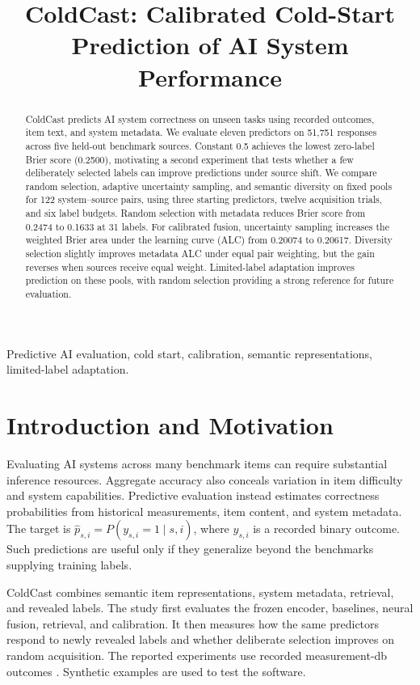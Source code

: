 \documentclass[conference]{IEEEtran}
\title{ColdCast: Calibrated Cold-Start Prediction of AI System Performance}
\author{
\IEEEauthorblockN{Yi Chen Kuo, Sudip Manchare, Jaideep Manupati, Akshada Shailesh Rane}
\IEEEauthorblockA{Department of Computer Science, Virginia Tech, Alexandria, Virginia, USA\\
\{alvin9840, akshada, jaideepm21, msudip\}@vt.edu}
}
\begin{document}
\maketitle

\begin{abstract}
ColdCast predicts AI system correctness on unseen tasks using recorded outcomes, item text, and system metadata. We evaluate eleven predictors on 51,751 responses across five held-out benchmark sources. Constant 0.5 achieves the lowest zero-label Brier score (0.2500), motivating a second experiment that tests whether a few deliberately selected labels can improve predictions under source shift. We compare random selection, adaptive uncertainty sampling, and semantic diversity on fixed pools for 122 system--source pairs, using three starting predictors, twelve acquisition trials, and six label budgets. Random selection with metadata reduces Brier score from 0.2474 to 0.1633 at 31 labels. For calibrated fusion, uncertainty sampling increases the weighted Brier area under the learning curve (ALC) from 0.20074 to 0.20617. Diversity selection slightly improves metadata ALC under equal pair weighting, but the gain reverses when sources receive equal weight. Limited-label adaptation improves prediction on these pools, with random selection providing a strong reference for future evaluation.
\end{abstract}
\begin{IEEEkeywords}
Predictive AI evaluation, cold start, calibration, semantic representations, limited-label adaptation.
\end{IEEEkeywords}

\section{Introduction and Motivation}
Evaluating AI systems across many benchmark items can require substantial inference resources. Aggregate accuracy also conceals variation in item difficulty and system capabilities. Predictive evaluation instead estimates correctness probabilities from historical measurements, item content, and system metadata. The target is $\hat p_{s,i}=P(y_{s,i}=1\mid s,i)$, where $y_{s,i}$ is a recorded binary outcome. Such predictions are useful only if they generalize beyond the benchmarks supplying training labels.

ColdCast combines semantic item representations, system metadata, retrieval, and revealed labels. The study first evaluates the frozen encoder, baselines, neural fusion, retrieval, and calibration. It then measures how the same predictors respond to newly revealed labels and whether deliberate selection improves on random acquisition. The reported experiments use recorded measurement-db outcomes \cite{measurement}. Synthetic examples are used to test the software.
\end{document}
